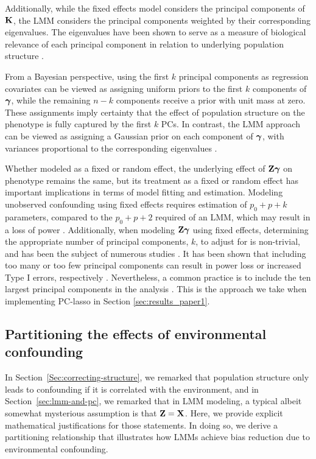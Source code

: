 Additionally, while the fixed effects model considers the principal components of $\mathbf{K}$, the LMM considers the principal components weighted by their corresponding eigenvalues. The eigenvalues have been shown to serve as a measure of biological relevance of each principal component in relation to underlying population structure \citep{hoffman2013correcting, price2006principal}. 

From a Bayesian perspective, using the first $k$ principal components as regression covariates can be viewed as assigning uniform priors to the first $k$ components of $\boldsymbol{\gamma}$, while the remaining $n - k$ components receive a prior with unit mass at zero. These assignments imply certainty that the effect of population structure on the phenotype is fully captured by the first $k$ PCs. In contrast, the LMM approach can be viewed as assigning a Gaussian prior on each component of $\boldsymbol{\gamma}$, with variances proportional to the corresponding eigenvalues \citep{astle2009population}. 



Whether modeled as a fixed or random effect, the underlying effect of $\mathbf{Z} \boldsymbol{\gamma}$ on phenotype remains the same, but its treatment as a fixed or random effect has important implications in terms of model fitting and estimation. Modeling unobserved confounding using fixed effects requires estimation of $p_0 + p + k$ parameters, compared to the $p_0 + p + 2$ required of an LMM, which may result in a loss of power \citep{zhang2015principal}. Additionally, when modeling $\mathbf{Z} \boldsymbol{\gamma}$ using fixed effects, determining the appropriate number of principal components, $k$, to adjust for is non-trivial, and has been the subject of numerous studies \citep{patterson2006population, zhao2018practical}. It has been shown that including too many or too few principal components can result in power loss or increased Type I errors, respectively \citep{zhang2015principal}. Nevertheless, a common practice is to include the ten largest principal components in the analysis \citep{zhao2018practical}. This is the approach we take when implementing PC-lasso in Section \ref{sec:results_paper1}.

\subsection{Partitioning the effects of environmental confounding}
\label{sec:partition}

In Section~\ref{Sec:correcting-structure}, we remarked that population structure only leads to confounding if it is correlated with the environment, and in Section~\ref{sec:lmm-and-pc}, we remarked that in LMM modeling, a typical albeit somewhat mysterious assumption is that $\mathbf{Z}=\mathbf{X}$.  Here, we provide explicit mathematical justifications for those statements.  In doing so, we derive a partitioning relationship that illustrates how LMMs achieve bias reduction due to environmental confounding.

